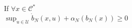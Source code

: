 \documentclass[preview]{standalone}
\begin{document}
\begin{center}
If $\forall x \in \mathcal{C}^*$\\$\sup_{u \in \mathcal{U}} \dot b_N(x, u) + \alpha_N(b_N(x)) \geq 0$
\end{center}
\end{document}
